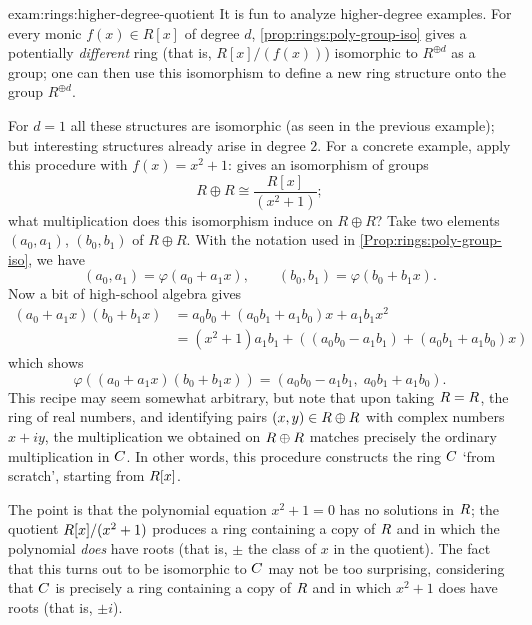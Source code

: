 \begin{exam}{}{exam:rings:higher-degree-quotient}
  It is fun to analyze higher-degree examples. For every monic
  $f(x) \in R[x]$ of degree $d$, \cref{prop:rings:poly-group-iso}
  gives a potentially \emph{different} ring (that is, $R[x]/(f(x))$)
  isomorphic to $R^{\oplus d}$ as a group; one can then use this
  isomorphism to define a new ring structure onto the group
  $R^{\oplus d}$.

  For $d = 1$ all these structures are isomorphic (as seen in the
  previous example); but interesting structures already arise in
  degree $2$. For a concrete example, apply this procedure with
  $f(x) = x^2 + 1$:  gives an
  isomorphism of groups
  \[
    R \oplus R \cong \frac{R[x]}{(x^2 + 1)};
  \]
  what multiplication does this isomorphism induce on $R \oplus R$?
  Take two elements $(a_0, a_1)$, $(b_0, b_1)$ of $R \oplus R$. With
  the notation used in \cref{Prop:rings:poly-group-iso}, we have
  \[
    (a_0, a_1) = \varphi(a_0 + a_1 x), \qquad (b_0, b_1) = \varphi(b_0
    + b_1 x).
  \]
  Now a bit of high-school algebra gives
  \begin{align*}
    (a_0 + a_1 x)(b_0 + b_1 x) &= a_0 b_0 + (a_0 b_1 + a_1 b_0)x + a_1 b_1 x^2 \\
                               &= (x^2 + 1)a_1 b_1 + ((a_0 b_0 - a_1 b_1) + (a_0 b_1 + a_1 b_0)x)
  \end{align*}
  which shows
  \[
    \varphi((a_0 + a_1 x)(b_0 + b_1 x)) = (a_0 b_0 - a_1 b_1,\; a_0
    b_1 + a_1 b_0).
  \]
  This recipe may seem somewhat arbitrary, but note that upon taking
  $R = R$, the ring of real numbers, and identifying pairs
  $(x, y) \in R \oplus R$ with complex numbers $x + iy$, the
  multiplication we obtained on $R \oplus R$ matches precisely the
  ordinary multiplication in $C$.  In other words, this procedure constructs the ring $C$
  `from scratch', starting from $R[x]$.
\end{exam}

The point is that the polynomial equation $x^2 + 1 = 0$ has no
solutions in $R$; the quotient $R[x]/(x^2 + 1)$ produces a ring
containing a copy of $R$ and in which the polynomial \emph{does} have
roots (that is, $\pm$ the class of $x$ in the quotient). The fact that
this turns out to be isomorphic to $C$ may not be too surprising,
considering that $C$ is precisely a ring containing a copy of $R$
and in which $x^2 + 1$ does have roots (that is, $\pm i$).

